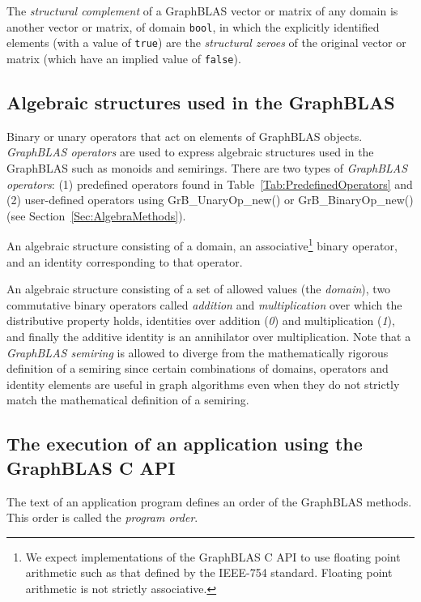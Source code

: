  The \emph{structural complement} of a 
GraphBLAS vector or matrix of any domain is another vector or matrix, 
of domain {\tt bool}, in which the explicitly identified elements (with a value of {\tt true}) 
are the \emph{structural zeroes} of the original vector or matrix 
(which have an implied value of {\tt false}). 
\glossEnd



\subsection{Algebraic structures used in the GraphBLAS}

\glossBegin
{} Binary or unary operators that act on elements of GraphBLAS 
objects.  \emph{GraphBLAS operators} are used to express algebraic structures used in the 
GraphBLAS such as monoids and semirings. There are two 
types of \emph{GraphBLAS operators}: (1) predefined operators found in Table~\ref{Tab:PredefinedOperators} 
and (2) user-defined operators using {\sf GrB\_UnaryOp\_new()} or {\sf GrB\_BinaryOp\_new()} (see Section~\ref{Sec:AlgebraMethods}).

 An algebraic structure consisting of a domain, an 
associative\footnote{We expect implementations of the GraphBLAS C API
to use floating point arithmetic such as that defined by the IEEE-754 standard.
Floating point arithmetic is not strictly associative.}
binary operator, and an identity corresponding to that 
operator.

 An algebraic structure consisting of a set of allowed values
(the \emph{domain}), two commutative binary operators called \emph{addition} 
and \emph{multiplication} over which the distributive property holds, identities 
over addition (\emph{0}) and multiplication (\emph{1}), and finally the additive
identity is an annihilator over multiplication.   
Note that a \emph{GraphBLAS semiring} is allowed to diverge from the mathematically 
rigorous definition of a semiring since certain combinations of domains, operators and identity 
elements are useful in graph algorithms even when they do not strictly match the mathematical
definition of a semiring.
\glossEnd



\subsection{The execution of an application using the GraphBLAS C API}
\glossBegin
{} The text of an application program defines an order
of the GraphBLAS methods. This order is called the \emph{program order}.

